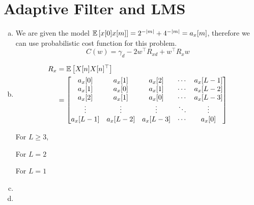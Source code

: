 \section{Adaptive Filter and LMS}\label{sec:p3}

\begin{enumerate}[(a)]
\item We are given the model $\mathbb{E} \left[ x[0]x[m] \right] = 2^{-\left\lvert m \right\rvert} + 4^{-\left\lvert m \right\rvert} = a_x[m]$, therefore we can use probabilistic cost function for this problem.
\[C(w) = \gamma_d - 2w^\top R_{xd} + w^\top R_x w\]

\item 
\begin{align*}
	R_x
	&= \mathbb{E} \left[ X[n] X[n]^\top \right] \\
	&= \begin{bmatrix} 
		a_x[0] & a_x[1] & a_x[2] & \cdots & a_x[L-1] \\
		a_x[1] & a_x[0] & a_x[1] & \cdots & a_x[L-2] \\
		a_x[2] & a_x[1] & a_x[0] & \cdots & a_x[L-3] \\
		\vdots & \vdots & \vdots & \ddots & \vdots \\
		a_x[L-1] & a_x[L-2] & a_x[L-3] & \cdots & a_x[0]
		 \end{bmatrix}
\end{align*}

For $L \geq 3$,

For $L = 2$

For $L = 1$

\item

\item 
\end{enumerate}